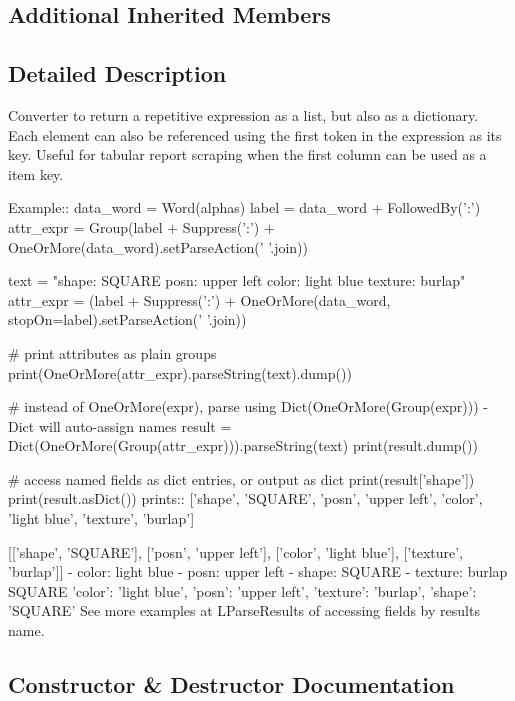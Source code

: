 \subsection*{Additional Inherited Members}


\subsection{Detailed Description}
\begin{DoxyVerb}Converter to return a repetitive expression as a list, but also as a dictionary.
Each element can also be referenced using the first token in the expression as its key.
Useful for tabular report scraping when the first column can be used as a item key.

Example::
    data_word = Word(alphas)
    label = data_word + FollowedBy(':')
    attr_expr = Group(label + Suppress(':') + OneOrMore(data_word).setParseAction(' '.join))

    text = "shape: SQUARE posn: upper left color: light blue texture: burlap"
    attr_expr = (label + Suppress(':') + OneOrMore(data_word, stopOn=label).setParseAction(' '.join))
    
    # print attributes as plain groups
    print(OneOrMore(attr_expr).parseString(text).dump())
    
    # instead of OneOrMore(expr), parse using Dict(OneOrMore(Group(expr))) - Dict will auto-assign names
    result = Dict(OneOrMore(Group(attr_expr))).parseString(text)
    print(result.dump())
    
    # access named fields as dict entries, or output as dict
    print(result['shape'])        
    print(result.asDict())
prints::
    ['shape', 'SQUARE', 'posn', 'upper left', 'color', 'light blue', 'texture', 'burlap']

    [['shape', 'SQUARE'], ['posn', 'upper left'], ['color', 'light blue'], ['texture', 'burlap']]
    - color: light blue
    - posn: upper left
    - shape: SQUARE
    - texture: burlap
    SQUARE
    {'color': 'light blue', 'posn': 'upper left', 'texture': 'burlap', 'shape': 'SQUARE'}
See more examples at L{ParseResults} of accessing fields by results name.
\end{DoxyVerb}
 

\subsection{Constructor \& Destructor Documentation}
\mbox{\label{classpkg__resources_1_1__vendor_1_1pyparsing_1_1Dict_a9947971188f313f29fcb5e7b17553590}} 
